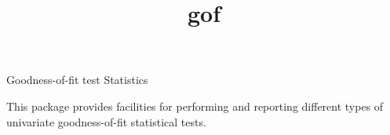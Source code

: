 \documentclass[12pt]{article}
\begin{document}
\begin{titlepage}
\title{gof}{Goodness-of-fit test Statistics}

This package provides facilities for performing and
reporting different types of univariate goodness-of-fit statistical tests.

\vfill
\end{titlepage}


\tableofcontents
{}












\end{document}
